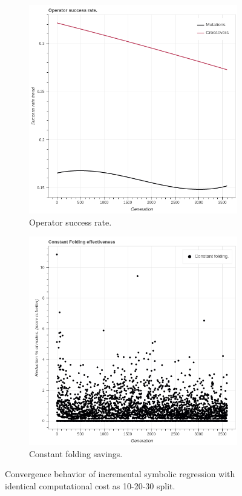 \begin{figure}
\begin{subfigure}{0.6\textwidth}
        \includegraphics[width=0.8\linewidth]{figures/incrementaloperatorsuccessrate30d.png}
        \caption{Operator success rate.}
    \end{subfigure}
    \begin{subfigure}{0.6\textwidth}
        \includegraphics[width=0.8\linewidth]{figures/incrementalconstfolding30d.png}
        \caption{Constant folding savings.}
    \end{subfigure}
    \caption{Convergence behavior of incremental symbolic regression with identical computational cost as 10-20-30 split.}
    \label{fig:incrementaldoubleconvergence}
\end{figure}
